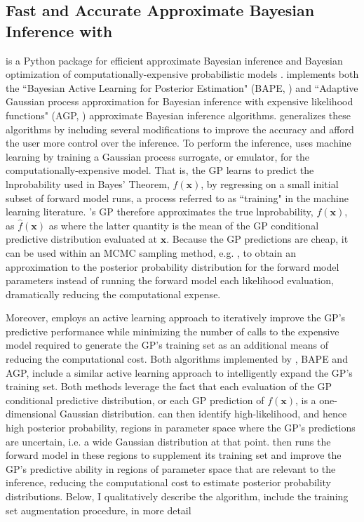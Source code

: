 \subsection{Fast and Accurate Approximate Bayesian Inference with \approxposterior}

\approxposterior is a Python package for efficient approximate Bayesian inference and Bayesian optimization of computationally-expensive probabilistic models \citep{FlemingVanderPlas2018}. \approxposterior implements both the ``Bayesian Active Learning for Posterior Estimation" (BAPE, \citet{Kandasamy2017}) and ``Adaptive Gaussian process approximation for Bayesian inference with expensive likelihood functions" (AGP, \citet{Wang2018}) approximate Bayesian inference algorithms. \approxposterior generalizes these algorithms by including several modifications to improve the accuracy and afford the user more control over the inference. To perform the inference, \approxposterior uses machine learning by training a Gaussian process \citep[GP,][]{Rasmussen2006} surrogate, or emulator, for the computationally-expensive model. That is, the GP learns to predict the lnprobability used in Bayes' Theorem, $f(\textbf{x})$, by regressing on a small initial subset of forward model runs, a process referred to as ``training" in the machine learning literature. \approxposterior's GP therefore approximates the true lnprobability, $f(\textbf{x})$, as $\hat{f}(\textbf{x})$ as where the latter quantity is the mean of the GP conditional predictive distribution evaluated at $\textbf{x}$. Because the GP predictions are cheap, it can be used within an MCMC sampling method, e.g. \emcee, to obtain an approximation to the posterior probability distribution for the forward model parameters instead of running the forward model each likelihood evaluation, dramatically reducing the computational expense. 

Moreover, \approxposterior employs an active learning approach to iteratively improve the GP's predictive performance while minimizing the number of calls to the expensive model required to generate the GP's training set as an additional means of reducing the computational cost. Both algorithms implemented by \approxposterior, BAPE and AGP, include a similar active learning approach to intelligently expand the GP's training set. Both methods leverage the fact that each evaluation of the GP conditional predictive distribution, or each GP prediction of $f(\textbf{x})$, is a one-dimensional Gaussian distribution.  \approxposterior can then identify high-likelihood, and hence high posterior probability, regions in parameter space where the GP's predictions are uncertain, i.e. a wide Gaussian distribution at that point.  \approxposterior then runs the forward model in these regions to supplement its training set and improve the GP's predictive ability in regions of parameter space that are relevant to the inference, reducing the computational cost to estimate posterior probability distributions. Below, I qualitatively describe the \approxposterior algorithm, include the training set augmentation procedure, in more detail

